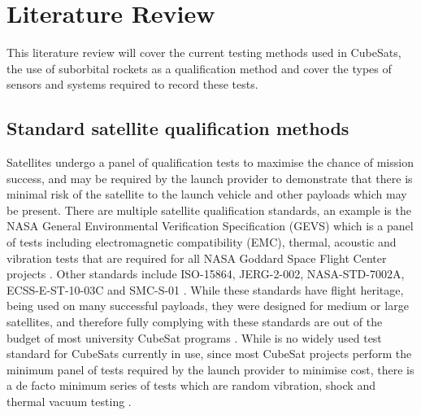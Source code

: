 \documentclass[a4paper,11pt]{article}
\begin{document}
\section{Literature Review}

This literature review will cover the current testing methods used in CubeSats, the use of suborbital rockets as a qualification method and cover the types of sensors and systems required to record these tests.

\subsection{Standard satellite qualification methods}
Satellites undergo a panel of qualification tests to maximise the chance of mission success, and may be required by the launch provider to demonstrate that there is minimal risk of the satellite to the launch vehicle and other payloads which may be present. There are multiple satellite qualification standards, an example is the NASA General Environmental Verification Specification (GEVS) which is a panel of tests including electromagnetic compatibility (EMC), thermal, acoustic and vibration tests that are required for all NASA Goddard Space Flight Center projects \cite{nasa-gevs}. Other standards include ISO-15864, JERG-2-002, NASA-STD-7002A, ECSS-E-ST-10-03C and SMC-S-01 \cite{cho2012overview}. While these standards have flight heritage, being used on many successful payloads, they were designed for medium or large satellites, and therefore fully complying with these standards are out of the budget of most university CubeSat programs \cite{cho2012overview}. While is no widely used test standard for CubeSats currently in use, since most CubeSat projects perform the minimum panel of tests required by the launch provider to minimise cost, there is a de facto minimum series of tests which are random vibration, shock and thermal vacuum testing \cite{welle2020overview}.

\end{document}
